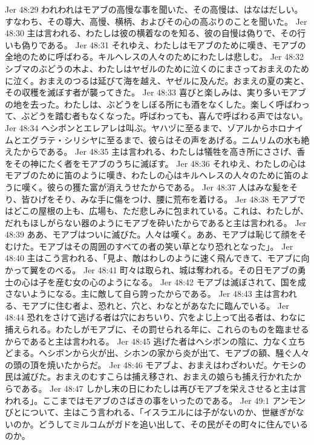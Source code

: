 Jer 48:29  われわれはモアブの高慢な事を聞いた、その高慢は、はなはだしい。すなわち、その尊大、高慢、横柄、およびその心の高ぶりのことを聞いた。
Jer 48:30  主は言われる、わたしは彼の横着なのを知る、彼の自慢は偽りで、その行いも偽りである。
Jer 48:31  それゆえ、わたしはモアブのために嘆き、モアブの全地のために呼ばわる。キルヘレスの人々のためにわたしは悲しむ。
Jer 48:32  シブマのぶどうの木よ、わたしはヤゼルのために泣くのにまさっておまえのために泣く。おまえのつるは延びて海を越え、ヤゼルに及んだ。おまえの夏の実と、その収穫を滅ぼす者が襲ってきた。
Jer 48:33  喜びと楽しみは、実り多いモアブの地を去った。わたしは、ぶどうをしぼる所にも酒をなくした。楽しく呼ばわって、ぶどうを踏む者もなくなった。呼ばわっても、喜んで呼ばわる声ではない。
Jer 48:34  ヘシボンとエレアレは叫ぶ。ヤハヅに至るまで、ゾアルからホロナイムとエグラテ・シリシヤに至るまで、彼らはその声をあげる。ニムリムの水も絶えたからである。
Jer 48:35  主は言われる、わたしは犠牲を高き所にささげ、香をその神にたく者をモアブのうちに滅ぼす。
Jer 48:36  それゆえ、わたしの心はモアブのために笛のように嘆き、わたしの心はキルヘレスの人々のために笛のように嘆く。彼らの獲た富が消えうせたからである。
Jer 48:37  人はみな髪をそり、皆ひげをそり、みな手に傷をつけ、腰に荒布を着ける。
Jer 48:38  モアブではどこの屋根の上も、広場も、ただ悲しみに包まれている。これは、わたしが、だれもほしがらない器のようにモアブを砕いたからであると主は言われる。
Jer 48:39  ああ、モアブはついに滅びた。人々は嘆く。ああ、モアブは恥じて顔をそむけた。モアブはその周囲のすべての者の笑い草となり恐れとなった」。
Jer 48:40  主はこう言われる、「見よ、敵はわしのように速く飛んできて、モアブに向かって翼をのべる。
Jer 48:41  町々は取られ、城は奪われる。その日モアブの勇士の心は子を産む女の心のようになる。
Jer 48:42  モアブは滅ぼされて、国を成さないようになる。主に敵して自ら誇ったからである。
Jer 48:43  主は言われる、モアブに住む者よ、恐れと、穴と、わなとがあなたに臨んでいる。
Jer 48:44  恐れをさけて逃げる者は穴におちいり、穴をよじ上って出る者は、わなに捕えられる。わたしがモアブに、その罰せられる年に、これらのものを臨ませるからであると主は言われる。
Jer 48:45  逃げた者はヘシボンの陰に、力なく立ちどまる。ヘシボンから火が出、シホンの家から炎が出て、モアブの額、騒ぐ人々の頭の頂を焼いたからだ。
Jer 48:46  モアブよ、おまえはわざわいだ。ケモシの民は滅びた。おまえのむすこらは捕え移され、おまえの娘らも捕え行かれたからである。
Jer 48:47  しかし末の日にわたしは再びモアブを栄えさせると主は言われる」。ここまではモアブのさばきの事をいったのである。
Jer 49:1  アンモンびとについて、主はこう言われる、「イスラエルには子がないのか、世継ぎがないのか。どうしてミルコムがガドを追い出して、その民がその町々に住んでいるのか。

